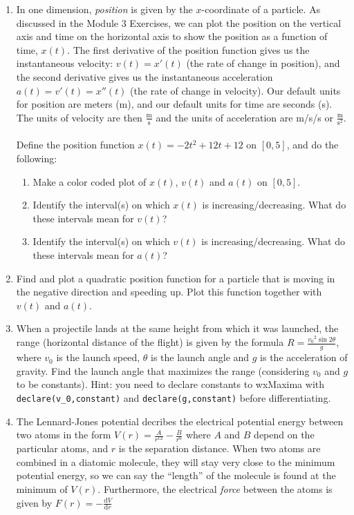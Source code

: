 \documentclass[10.5pt,twoside]{report}
\theoremstyle{definition}
\begin{document}
\begin{enumerate}
 
\item
In one dimension, \textit{position} is given by the $x$-coordinate of a particle.  As discussed in the Module 3 Exercises, we can plot the position on the vertical axis and time on the horizontal axis to show the position as a function of time, $x(t)$.  The first derivative of the position function gives us the instantaneous velocity:  $v(t)=x'(t)$ (the rate of change in position), and the second derivative gives us the instantaneous acceleration $a(t)=v'(t)=x''(t)$ (the rate of change in velocity).  Our default units for position are meters (m), and our default units for time are seconds (s).  The units of velocity are then $\frac{\mathrm{m}}{\mathrm{s}}$ and the units of acceleration are m/s/s or $\frac{\mathrm{m}}{\mathrm{s^2}}$. \\
${}$\\
Define the position function $x(t)=-2t^2+12t+12$ on $[0,5]$, and do the following:

 \begin{enumerate}
   \item Make a color coded plot of $x(t)$, $v(t)$ and $a(t)$ on $[0,5]$.
   \item Identify the interval(s) on which $x(t)$ is increasing/decreasing.  What do these intervals mean for $v(t)$?
   \item Identify the interval(s) on which $v(t)$ is increasing/decreasing.  What do these intervals mean for $a(t)$?
 \end{enumerate}

\item Find and plot a quadratic position function for a particle that is moving in the negative direction and speeding up.  Plot this function together with $v(t)$ and $a(t)$.

\item
When a projectile lands at the same height from which it was launched, the range (horizontal distance of the flight) is given by the formula $R=\frac{{v_0}^2 \sin{2 \theta}}{g}$, where $v_0$ is the launch speed, $\theta$ is the launch angle and $g$ is the acceleration of gravity.  Find the launch angle that maximizes the range (considering $v_0$ and $g$ to be constants).  Hint:  you need to declare constants to wxMaxima with \verb|declare(v_0,constant)| and \verb|declare(g,constant)| before differentiating.

\item
The Lennard-Jones potential decribes the electrical potential energy between two atoms in the form $V(r)=\frac{A}{r^{12}} - \frac{B}{r^6}$ where $A$ and $B$ depend on the particular atoms, and $r$ is the separation distance.  When two atoms are combined in a diatomic molecule, they will stay very close to the minimum potential energy, so we can say the ``length'' of the molecule is found at the minimum of $V(r)$.  Furthermore, the electrical \textit{force} between the atoms is given by $F(r)=-\frac{\mathrm{d}V}{\mathrm{d}r}$


\end{enumerate}
\end{document}
